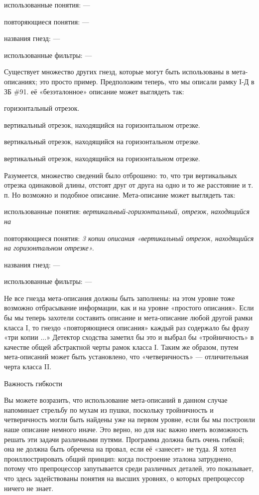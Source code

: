 \documentclass[../main.tex]{subfiles}
\begin{document}
использованные понятия: ---

повторяющиеся понятия: ---

названия гнезд: ---

использованные фильтры: ---

Существует множество других гнезд, которые могут быть использованы в мета-описаниях; это просто пример. Предположим теперь, что мы описали рамку I-Д в ЗБ \#91. её «безэталонное» описание может выглядеть так:

горизонтальный отрезок.

вертикальный отрезок, находящийся на горизонтальном отрезке.

вертикальный отрезок, находящийся на горизонтальном отрезке.

вертикальный отрезок, находящийся на горизонтальном отрезке.

Разумеется, множество сведений было отброшено: то, что три вертикальных отрезка одинаковой длины, отстоят друг от друга на одно и то же расстояние и т. п. Но возможно и подобное описание. Мета-описание может выглядеть так:

использованные понятия: \emph{вертикальный-горизонтальный, отрезок, находящийся на}

повторяющиеся понятия: \emph{3 копии описания «вертикальный отрезок, находящийся на горизонтальном отрезке».}

названия гнезд: ---

использованные фильтры: ---

Не все гнезда мета-описания должны быть заполнены: на этом уровне тоже возможно отбрасывание информации, как и на уровне «простого описания». Если бы мы теперь захотели составить описание и мета-описание любой другой рамки класса I, то гнездо «повторяющиеся описания» каждый раз содержало бы фразу «три копии ...» Детектор сходства заметил бы это и выбрал бы «тройничность» в качестве общей абстрактной черты рамок класса I. Таким же образом, путем мета-описаний может быть установлено, что «четверичность» --- отличительная черта класса II.

Важность гибкости

Вы можете возразить, что использование мета-описаний в данном случае напоминает стрельбу по мухам из пушки, поскольку тройничность и четверичность могли быть найдены уже на первом уровне, если бы мы построили наше описание немного иначе. Это верно, но для нас важно иметь возможность решать эти задачи различными путями. Программа должна быть очень гибкой; она не должна быть обречена на провал, если её «занесет» не туда. Я хотел проиллюстрировать общий принцип: когда построение эталона затруднено, потому что препроцессор запутывается среди различных деталей, это показывает, что здесь задействованы понятия на высших уровнях, о которых препроцессор ничего не знает.
\end{document}
